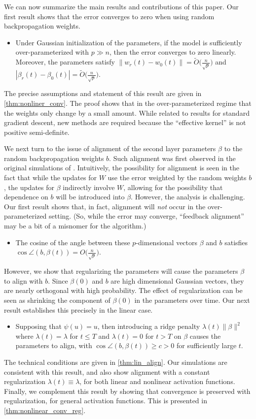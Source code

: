 We can now summarize the main results and contributions of this paper. Our first result shows that the error converges to zero when using random backpropagation weights.

\begin{itemize}
  \item Under Gaussian initialization of the parameters, if the model is sufficiently over-parameterized with $p\gg n$, then the error converges to zero linearly. Moreover, the parameters satisfy $\|w_r(t) - w_0(t) \| = \widetilde O\bigl(\frac{n}{\sqrt{p}}\bigr)$
    and $|\beta_r(t) - \beta_0(t) | = \widetilde O\bigl(\frac{n}{\sqrt{p}}\bigr)$.
\end{itemize}
The precise assumptions and statement of this result are given in \cref{thm:nonliner_conv}. The proof
shows that in the over-parameterized regime that the weights only change
by a small amount. While related to results for standard gradient descent,
new methods are required because the ``effective kernel'' is not positive semi-definite.

We next turn to the issue of alignment of the second layer parameters $\beta$ to the random backpropagation weights $b$. Such alignment was first observed in the original simulations of \cite{lillicrap2016random}. Intuitively, the possibility for alignment is seen in the fact that while the updates for $W$ use the error weighted by the random weights $b$, the updates for $\beta$ indirectly involve $W$, allowing for the possibility that dependence on $b$ will be introduced into $\beta$. However, the analysis is challenging. Our first result shows that, in fact, alignment will \textit{not} occur in the over-parameterized setting.
(So, while the error may converge, ``feedback alignment'' may be a bit of a misnomer for the algorithm.)
\begin{itemize}
\item The cosine of the angle between
these $p$-dimensional vectors $\beta$ and $b$ satisfies $ \cos\angle(b, \beta(t)) = O\big(\frac{n}{\sqrt p}\big)$.
\end{itemize}
 However, we show that regularizing the parameters will cause the parameters $\beta$ to align with $b$. Since $\beta(0)$ and $b$ are high dimensional Gaussian vectors, they are nearly orthogonal with high probability. The effect of regularization can be seen as shrinking the component of $\beta(0)$ in the parameters over time.  Our next result establishes this precisely in the linear case.
\begin{itemize}
\item Supposing that $\psi(u)=u$, then introducing a ridge penalty $\lambda(t) \|\beta\|^2$ where $\lambda(t) = \lambda$ for $t\leq T$ and $\lambda(t) = 0$ for $t > T$
on $\beta$  causes the parameters to align, with $\cos\angle(b, \beta(t)) \geq c > 0$ for sufficiently large $t$.
\end{itemize}
The technical conditions are given in \cref{thm:lin_align}.
Our simulations are consistent with this result, and also show alignment with a constant regularization $\lambda(t)\equiv \lambda$, for both linear and nonlinear activation functions. Finally, we complement this result by showing that convergence is preserved with regularization, for general activation functions. This is presented in \cref{thm:nonlinear_conv_reg}.
